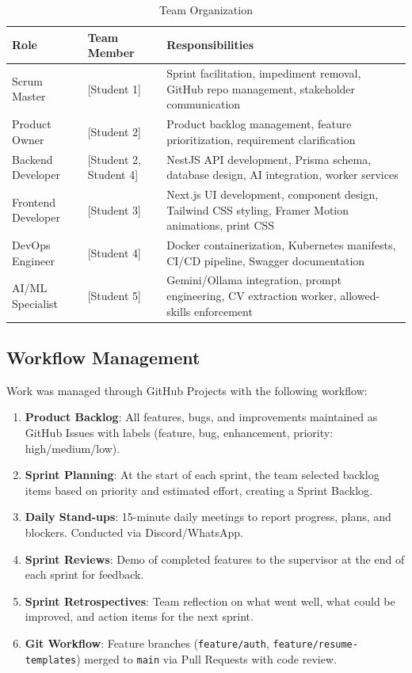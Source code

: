\documentclass[12pt,a4paper]{report}
\begin{document}
\begin{table}[H]
\centering
\caption{Team Organization}
\begin{tabular}{|l|l|p{6cm}|}
\hline
\textbf{Role} & \textbf{Team Member} & \textbf{Responsibilities} \\
\hline
Scrum Master & [Student 1] & Sprint facilitation, impediment removal, GitHub repo management, stakeholder communication \\
\hline
Product Owner & [Student 2] & Product backlog management, feature prioritization, requirement clarification \\
\hline
Backend Developer & [Student 2, Student 4] & NestJS API development, Prisma schema, database design, AI integration, worker services \\
\hline
Frontend Developer & [Student 3] & Next.js UI development, component design, Tailwind CSS styling, Framer Motion animations, print CSS \\
\hline
DevOps Engineer & [Student 4] & Docker containerization, Kubernetes manifests, CI/CD pipeline, Swagger documentation \\
\hline
AI/ML Specialist & [Student 5] & Gemini/Ollama integration, prompt engineering, CV extraction worker, allowed-skills enforcement \\
\hline
\end{tabular}
\end{table}

\subsection{Workflow Management}
Work was managed through GitHub Projects with the following workflow:

\begin{enumerate}[label=\textbf{W-\arabic*}:, leftmargin=*]
    \item \textbf{Product Backlog}: All features, bugs, and improvements maintained as GitHub Issues with labels (feature, bug, enhancement, priority: high/medium/low).
    \item \textbf{Sprint Planning}: At the start of each sprint, the team selected backlog items based on priority and estimated effort, creating a Sprint Backlog.
    \item \textbf{Daily Stand-ups}: 15-minute daily meetings to report progress, plans, and blockers. Conducted via Discord/WhatsApp.
    \item \textbf{Sprint Reviews}: Demo of completed features to the supervisor at the end of each sprint for feedback.
    \item \textbf{Sprint Retrospectives}: Team reflection on what went well, what could be improved, and action items for the next sprint.
    \item \textbf{Git Workflow}: Feature branches (\texttt{feature/auth}, \texttt{feature/resume-templates}) merged to \texttt{main} via Pull Requests with code review.
\end{enumerate}
\end{document}
